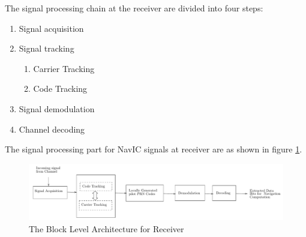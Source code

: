 
The signal processing chain at the receiver are divided into four steps:
\begin{enumerate}
	\item Signal acquisition
	\item Signal tracking
	\begin{enumerate}
		\item Carrier Tracking
		\item Code Tracking
	\end{enumerate}
	\item Signal demodulation
	\item Channel decoding
\end{enumerate}
The signal processing part for NavIC signals at receiver are as shown in figure \ref{fig:demod_flow}.
\begin{normalsize}
	\begin{figure}[ht]
		\centering
		\includegraphics[width=1\columnwidth]{figs/signal_acq}
		\centering
		\captionsetup{justification=centering}
		\caption{The Block Level Architecture for Receiver}
		\label{fig:demod_flow}
	\end{figure}
\end{normalsize}
\\
\\
